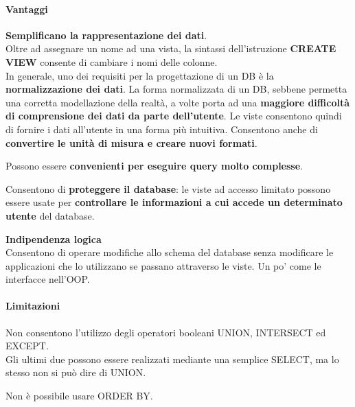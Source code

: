 \documentclass[10pt]{book}
\begin{document}
\paragraph{Vantaggi} 
\begin{list}{}{}
	\item \textbf{Semplificano la rappresentazione dei dati}.\\
	Oltre ad assegnare un nome ad una vista, la sintassi dell'istruzione \textbf{CREATE VIEW} consente di cambiare i nomi delle colonne.\\
	In generale, uno dei requisiti per la progettazione di un DB è la \textbf{normalizzazione dei dati}. La forma normalizzata di un DB, sebbene permetta una corretta modellazione della realtà, a volte porta ad una \textbf{maggiore difficoltà di comprensione dei dati da parte dell'utente}. Le viste consentono quindi di fornire i dati all'utente in una forma più intuitiva. Consentono anche di \textbf{convertire le unità di misura e creare nuovi formati}.
	\item Possono essere \textbf{convenienti per eseguire query molto complesse}.
	\item Consentono di \textbf{proteggere il database}: le viste ad accesso limitato possono essere usate per \textbf{controllare le informazioni a cui accede un determinato utente} del database.
	\item \textbf{Indipendenza logica}\\
	Consentono di operare modifiche allo schema del database senza modificare le applicazioni che lo utilizzano se passano attraverso le viste. Un po' come le interfacce nell'OOP.
\end{list}
\paragraph{Limitazioni}
\begin{list}{}{}
	\item Non consentono l'utilizzo degli operatori booleani UNION, INTERSECT ed EXCEPT.\\
	Gli ultimi due possono essere realizzati mediante una semplice SELECT, ma lo stesso non si può dire di UNION.
	\item Non è possibile usare ORDER BY.
\end{list}
\end{document}
